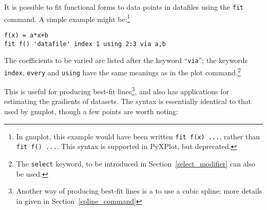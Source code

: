 It is possible to fit functional forms to data points in datafiles using the
\texttt{fit} command. A simple example might be:\footnote{In gnuplot, this example would have been written \texttt{fit f(x) ...}, rather than \texttt{fit f() ...}. This syntax is supported in PyXPlot, but deprecated.}

\begin{verbatim}
f(x) = a*x+b
fit f() 'datafile' index 1 using 2:3 via a,b
\end{verbatim}

The coefficients to be varied are listed after the keyword ``\texttt{via}'';
the keywords \texttt{index}, \texttt{every} and \texttt{using} have the same
meanings as in the plot command.\footnote{The \texttt{select} keyword, to be
introduced in Section~\ref{select_modifier} can also be used.}

This is useful for producing best-fit lines\footnote{Another way of producing best-fit lines is a to use a cubic
spline; more details in given in Section~\ref{spline_command}}, and also has
applications for estimating the gradients of datasets.  The syntax is
essentially identical to that used by gnuplot, though a few points are worth
noting:

